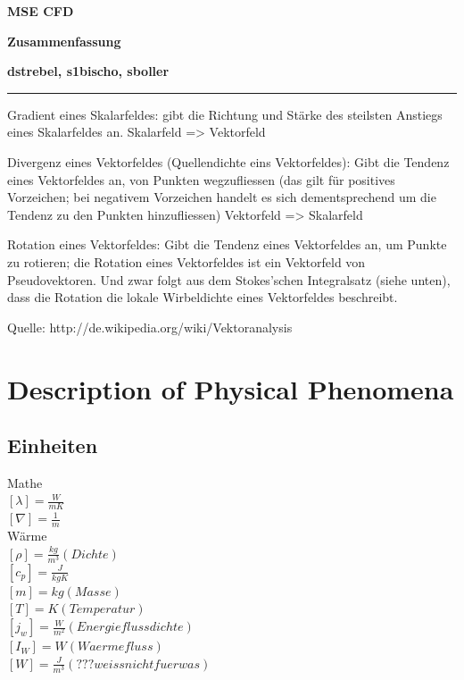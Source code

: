 \documentclass[a4paper]{scrartcl}
\begin{document}
\pagestyle{fancy}
\fancyhf{} 
\fancyfoot[C]{\thepage} %
\renewcommand{\headrulewidth}{0pt}
\renewcommand{\footrulewidth}{0.5pt}

 \centerline{\LARGE \bf \textsf{MSE CFD}} 
 \smallskip
\centerline{\Large \bf \textsf {Zusammenfassung}}
\medskip
  \centerline{\bf \textsf{dstrebel, s1bischo, sboller }}

 \smallskip \noindent\rule{\textwidth}{0.5pt}
\smallskip%




Gradient eines Skalarfeldes: gibt die Richtung und Stärke des steilsten Anstiegs
eines Skalarfeldes an.
Skalarfeld => Vektorfeld

Divergenz eines Vektorfeldes (Quellendichte eins Vektorfeldes): Gibt die Tendenz
eines Vektorfeldes an, von Punkten wegzufliessen (das gilt für positives
Vorzeichen; bei negativem Vorzeichen handelt es sich dementsprechend um die
Tendenz zu den Punkten hinzufliessen) Vektorfeld => Skalarfeld

Rotation eines Vektorfeldes: Gibt die Tendenz eines Vektorfeldes an, um Punkte
zu rotieren; die Rotation eines Vektorfeldes ist ein Vektorfeld von
Pseudovektoren. Und zwar folgt aus dem Stokes’schen Integralsatz (siehe unten),
dass die Rotation die lokale Wirbeldichte eines Vektorfeldes beschreibt.

Quelle: http://de.wikipedia.org/wiki/Vektoranalysis



\section{Description of Physical Phenomena}
\subsection{Einheiten}

Mathe\\
$ [\lambda]=\frac{W}{mK} $\\
$ [\nabla]=\frac{1}{m} $\\

Wärme\\
$ [\rho]=\frac{kg}{m^3} (Dichte)$\\
$ [c_p]=\frac{J}{kgK} $\\
$ [m]=kg (Masse)$\\
$ [T]=K (Temperatur)$\\
$ [j_w]=\frac{W}{m^2} (Energieflussdichte)$\\
$ [I_W]=W (Waermefluss)$\\
$ [W]=\frac{J}{m^3} (???weiss nicht fuer was)$\\
\end{document}
